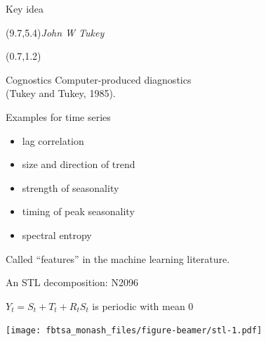 \documentclass[14pt,ignorenonframetext,]{beamer}
\providecommand{\tightlist}{%
  \setlength{\itemsep}{0pt}\setlength{\parskip}{0pt}}
\begin{document}
\begin{frame}{Key idea}
\protect\hypertarget{key-idea}{}

\begin{textblock}{3}(9.7,5.4)\small\textit{John W Tukey}\end{textblock}
\begin{textblock}{8}(0.7,1.2)
\begin{alertblock}{Cognostics}
Computer-produced diagnostics\\ (Tukey and Tukey, 1985).
\end{alertblock}
\end{textblock}\pause
\vspace*{2.5cm}

\alert{Examples for time series}

\begin{itemize}
\tightlist
\item
  lag correlation
\item
  size and direction of trend
\item
  strength of seasonality
\item
  timing of peak seasonality
\item
  spectral entropy
\end{itemize}

\vspace*{0.3cm}
\begin{block}{}
Called ``features'' in the machine learning literature.
\end{block}

\end{frame}

\begin{frame}{An STL decomposition: N2096}
\protect\hypertarget{an-stl-decomposition-n2096}{}

\begin{alertblock}{}
\centerline{$Y_t = S_t + T_t + R_t$\qquad $S_{t}$ is periodic with mean 0}
\end{alertblock}

\texttt{[image: fbtsa\_monash\_files/figure-beamer/stl-1.pdf]}

\end{frame}
\end{document}
